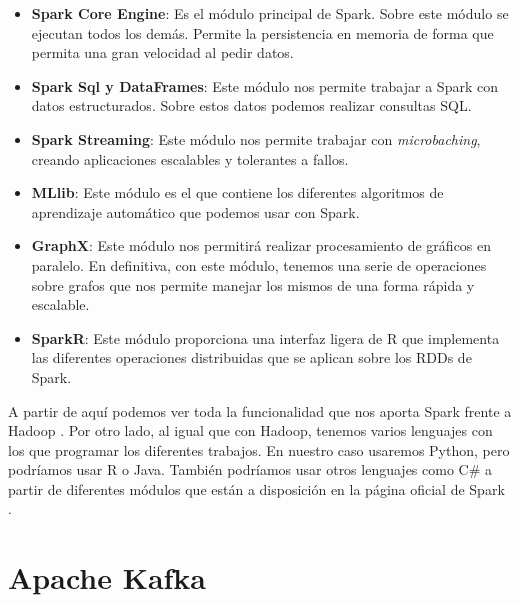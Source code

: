 \begin{itemize}
\item \textbf{Spark Core Engine}: Es el módulo principal de Spark. Sobre
  este módulo se ejecutan todos los demás. Permite la persistencia en
  memoria de forma que permita una gran velocidad al pedir datos.
\item \textbf{Spark Sql y DataFrames}: Este módulo nos permite trabajar a
  Spark con datos estructurados. Sobre estos datos podemos realizar
  consultas SQL.
\item \textbf{Spark Streaming}: Este módulo nos permite trabajar con {\em
    microbaching}, creando aplicaciones escalables y tolerantes a fallos.
\item \textbf{MLlib}: Este módulo es el que contiene los diferentes
  algoritmos de aprendizaje automático que podemos usar con Spark.
\item \textbf{GraphX}: Este módulo nos permitirá realizar procesamiento de
  gráficos en paralelo. En definitiva, con este módulo, tenemos una serie
  de operaciones sobre grafos que nos permite manejar los mismos de una
  forma rápida y escalable.
\item \textbf{SparkR}: Este módulo proporciona una interfaz ligera de R que
  implementa las diferentes operaciones distribuidas que se aplican sobre
  los RDDs de Spark.
\end{itemize}

A partir de aquí podemos ver toda la funcionalidad que nos aporta Spark
frente a Hadoop \cite{Spk-7}. Por otro lado, al igual que con Hadoop,
tenemos varios lenguajes con los que programar los diferentes trabajos. En
nuestro caso usaremos Python, pero podríamos usar R o Java. También
podríamos usar otros lenguajes como C\# a partir de diferentes módulos que
están a disposición en la página oficial de Spark \cite{Spk-6}.


\section{Apache Kafka\label{Kafka}}

